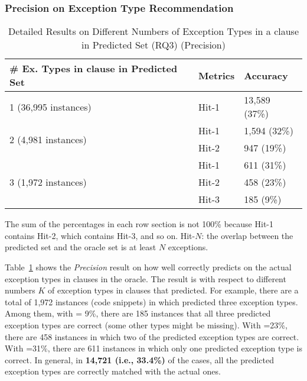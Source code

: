 
\subsubsection{{\bf Precision on Exception Type Recommendation}}
\label{sec:req3-precision}


\begin{table}[t]
  \caption{Detailed Results on Different Numbers of Exception Types in a  clause in Predicted Set (RQ3) (Precision)}
	\vspace{-12pt}
	{\small
		\begin{center}
			\renewcommand{\arraystretch}{1}
			\begin{tabular}{p{5cm}<{\centering}|p{1cm}<{\centering}|p{1.5cm}<{\centering}}
				\hline
				\# Ex. Types in \code{catch} clause in Predicted Set & Metrics & Accuracy \\
				\hline
				\multirow{1}{*}{1 (36,995 instances)}   & Hit-1  & 13,589 (37\%) \\
				\hline
				\multirow{2}{*}{2 (4,981 instances)}  & Hit-1   & 1,594 (32\%) \\
				& Hit-2       						& 947 (19\%) \\
				\hline
				\multirow{3}{*}{3 (1,972 instances)}  & Hit-1    & 611 (31\%) \\
				& Hit-2         					& 458 (23\%)\\
				& Hit-3         				  	& 185 (9\%) \\
				\hline
			\end{tabular}
                        The sum of the percentages in each row section is not 100\% because Hit-1 contains Hit-2, which contains Hit-3, and so on. Hit-$N$: the overlap between the predicted set and the oracle set is at least $N$ exceptions.
			\label{tab:precision-3}
		\end{center}
	}
\end{table}

Table~\ref{tab:precision-3} shows the {\em Precision} result on how
well {\tool} correctly predicts on the actual exception types in
 clauses in the oracle. The result is with respect to
different numbers $K$ of exception types in  clauses that
{\tool} predicted. For example, there are a total of 1,972 instances
(code snippets) in which {\tool} predicted three exception types.
Among them, with  = 9\%, there are 185 instances that all
three predicted exception types are correct (some other types might be
missing). With =23\%, there are 458 instances in which two
of the predicted exception types are correct. With =31\%,
there are 611 instances in which only one predicted exception type is
correct. In general, in {\bf 14,721 (i.e., 33.4\%)} of the cases, all
the predicted exception types are correctly matched with the actual
ones.


